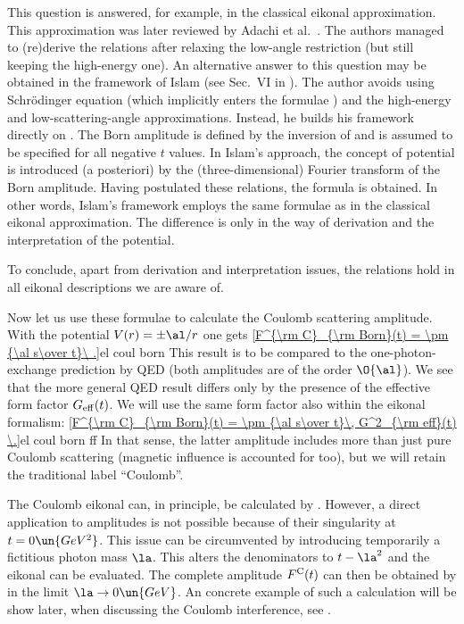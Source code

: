 This question is answered, for example, in the classical eikonal approximation. This approximation was later reviewed by Adachi et al.~. The authors managed to (re)derive the relations  after relaxing the low-angle restriction (but still keeping the high-energy one). An alternative answer to this question may be obtained in the framework of Islam (see Sec.~VI in ). The author avoids using Schr\" odinger equation (which implicitly enters the formulae ) and the high-energy and low-scattering-angle approximations. Instead, he builds his framework directly on . The Born amplitude is defined by the inversion of  and is assumed to be specified for all negative $t$ values. In Islam's approach, the concept of potential is introduced (a posteriori) by the (three-dimensional) Fourier transform of the Born amplitude. Having postulated these relations, the formula  is obtained. In other words, Islam's framework employs the same formulae  as in the classical eikonal approximation. The difference is only in the way of derivation and the interpretation of the potential. 

To conclude, apart from derivation and interpretation issues, the relations  hold in all eikonal descriptions we are aware of.

Now let us use these formulae to calculate the Coulomb scattering amplitude. With the potential $V(r) = \pm \al/r$ one gets
\eqref{F^{\rm C}_{\rm Born}(t) = \pm {\al s\over t}\ .}{el coul born}
This result is to be compared to the one-photon-exchange prediction by QED  (both amplitudes are of the order $\O{\al}$). We see that the more general QED result differs only by the presence of the effective form factor $G_{\rm eff}(t)$. We will use the same form factor also within the eikonal formalism:
\eqref{F^{\rm C}_{\rm Born}(t) = \pm {\al s\over t}\, G^2_{\rm eff}(t) \.}{el coul born ff}
In that sense, the latter amplitude includes more than just pure Coulomb scattering (magnetic influence is accounted for too), but we will retain the traditional label ``Coulomb''.

The Coulomb eikonal can, in principle, be calculated by . However, a direct application to amplitudes  is not possible because of their singularity at $t=0\un{GeV^2}$. This issue can be circumvented by introducing temporarily a fictitious photon mass $\la$. This alters the denominators to $t - \la^2$ and the eikonal can be evaluated. The complete amplitude $F^{\rm C}(t)$ can then be obtained by  in the limit $\la \to 0\un{GeV}$. An concrete example of such a calculation will be show later, when discussing the Coulomb interference, see .


